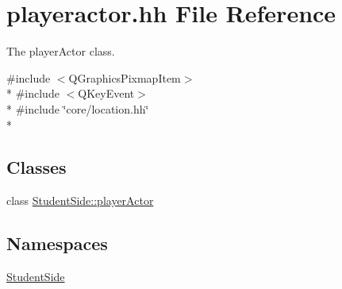 \hypertarget{playeractor_8hh}{\section{playeractor.\-hh File Reference}
\label{playeractor_8hh}
}


The player\-Actor class.  


{\ttfamily \#include $<$Q\-Graphics\-Pixmap\-Item$>$}\\*
{\ttfamily \#include $<$Q\-Key\-Event$>$}\\*
{\ttfamily \#include \char`\"{}core/location.\-hh\char`\"{}}\\*
\subsection*{Classes}
\begin{DoxyCompactItemize}
\item 
class \hyperlink{class_student_side_1_1player_actor}{Student\-Side\-::player\-Actor}
\end{DoxyCompactItemize}
\subsection*{Namespaces}
\begin{DoxyCompactItemize}
\item 
\hyperlink{namespace_student_side}{Student\-Side}
\end{DoxyCompactItemize}
